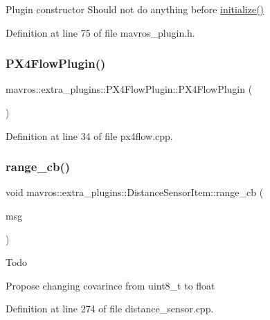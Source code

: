 Plugin constructor Should not do anything before \mbox{\hyperlink{group__plugin_gad5313a41da4d26acbbabf008cdc21e82}{initialize()}} 



Definition at line 75 of file mavros\+\_\+plugin.\+h.

\mbox{\label{group__plugin_ga865789c98ace44070bec3c1f9fdc6201}} 
\subsubsection{\texorpdfstring{PX4FlowPlugin()}{PX4FlowPlugin()}}
{\footnotesize\ttfamily mavros\+::extra\+\_\+plugins\+::\+P\+X4\+Flow\+Plugin\+::\+P\+X4\+Flow\+Plugin (\begin{DoxyParamCaption}{ }\end{DoxyParamCaption})\hspace{0.3cm}{\ttfamily [inline]}}



Definition at line 34 of file px4flow.\+cpp.

\mbox{\label{group__plugin_ga57b6fa996ec369d2474ff69c77434917}} 
\subsubsection{\texorpdfstring{range\_cb()}{range\_cb()}}
{\footnotesize\ttfamily void mavros\+::extra\+\_\+plugins\+::\+Distance\+Sensor\+Item\+::range\+\_\+cb (\begin{DoxyParamCaption}\item[{const sensor\+\_\+msgs\+::\+Range\+::\+Const\+Ptr \&}]{msg }\end{DoxyParamCaption})}

\begin{DoxyRefDesc}{Todo}
\item[\mbox{\hyperlink{todo__todo000008}{Todo}}]Propose changing covarince from uint8\+\_\+t to float \end{DoxyRefDesc}


Definition at line 274 of file distance\+\_\+sensor.\+cpp.

\mbox{\label{group__plugin_gab0a112620c3efe3757c993f0b2bfb9fa}} 
